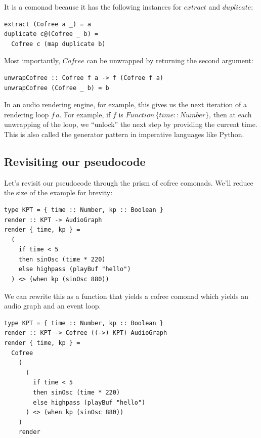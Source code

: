 \documentclass{article}
\begin{document}
It is a comonad because it has the following instances for $extract$ and $duplicate$:

\lstset{language=Haskell, style=psstyle}
\begin{lstlisting}
extract (Cofree a _) = a
duplicate c@(Cofree _ b) =
  Cofree c (map duplicate b)
\end{lstlisting}

Most importantly, $Cofree$ can be unwrapped by returning the second argument:

\lstset{language=Haskell, style=psstyle}
\begin{lstlisting}
unwrapCofree :: Cofree f a -> f (Cofree f a)
unwrapCofree (Cofree _ b) = b
\end{lstlisting}

In an audio rendering engine, for example, this gives us the next iteration of a rendering loop $f\,a$. For example, if $f$ is $Function\,\{ time :: Number \}$, then at each unwrapping of the loop, we ``unlock'' the next step by providing the current time. This is also called the generator pattern in imperative languages like Python.

\subsection{Revisiting our pseudocode}

Let's revisit our pseudocode through the prism of cofree comonads. We'll reduce the size of the example for brevity:

\lstset{language=Haskell, style=psstyle}
\begin{lstlisting}
type KPT = { time :: Number, kp :: Boolean }
render :: KPT -> AudioGraph
render { time, kp } =
  (
    if time < 5
    then sinOsc (time * 220)
    else highpass (playBuf "hello")
  ) <> (when kp (sinOsc 880))
\end{lstlisting}

We can rewrite this as a function that yields a cofree comonad which yields an audio graph and an event loop.

\lstset{language=Haskell, style=psstyle}
\begin{lstlisting}
type KPT = { time :: Number, kp :: Boolean }
render :: KPT -> Cofree ((->) KPT) AudioGraph
render { time, kp } =
  Cofree
    (
      (
        if time < 5
        then sinOsc (time * 220)
        else highpass (playBuf "hello")
      ) <> (when kp (sinOsc 880))
    )
    render
\end{lstlisting}
\end{document}

